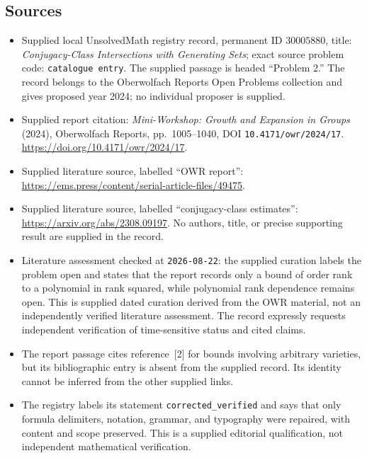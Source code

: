 \documentclass[11pt]{article}
\begin{document}
\subsection{Sources}
\begin{itemize}
\item Supplied local UnsolvedMath registry record, permanent ID \(30005880\), title: \emph{Conjugacy-Class Intersections with Generating Sets}; exact source problem code: \texttt{catalogue entry}. The supplied passage is headed ``Problem 2.'' The record belongs to the Oberwolfach Reports Open Problems collection and gives proposed year 2024; no individual proposer is supplied.
\item Supplied report citation: \emph{Mini-Workshop: Growth and Expansion in Groups} (2024), Oberwolfach Reports, pp.~1005--1040, DOI \texttt{10.4171/owr/2024/17}. \url{https://doi.org/10.4171/owr/2024/17}.
\item Supplied literature source, labelled ``OWR report'': \url{https://ems.press/content/serial-article-files/49475}.
\item Supplied literature source, labelled ``conjugacy-class estimates'': \url{https://arxiv.org/abs/2308.09197}. No authors, title, or precise supporting result are supplied in the record.
\item Literature assessment checked at \texttt{2026-08-22}: the supplied curation labels the problem open and states that the report records only a bound of order rank to a polynomial in rank squared, while polynomial rank dependence remains open. This is supplied dated curation derived from the OWR material, not an independently verified literature assessment. The record expressly requests independent verification of time-sensitive status and cited claims.
\item The report passage cites reference~[2] for bounds involving arbitrary varieties, but its bibliographic entry is absent from the supplied record. Its identity cannot be inferred from the other supplied links.
\item The registry labels its statement \texttt{corrected\_verified} and says that only formula delimiters, notation, grammar, and typography were repaired, with content and scope preserved. This is a supplied editorial qualification, not independent mathematical verification.
\end{itemize}
\end{document}
